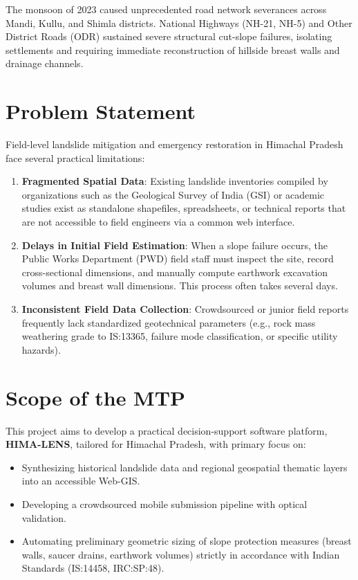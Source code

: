 \documentclass[12pt,a4paper]{report}
\begin{document}
The monsoon of 2023 caused unprecedented road network severances across Mandi, Kullu, and Shimla districts. National Highways (NH-21, NH-5) and Other District Roads (ODR) sustained severe structural cut-slope failures, isolating settlements and requiring immediate reconstruction of hillside breast walls and drainage channels.

\section{Problem Statement}
Field-level landslide mitigation and emergency restoration in Himachal Pradesh face several practical limitations:
\begin{enumerate}
    \item \textbf{Fragmented Spatial Data}: Existing landslide inventories compiled by organizations such as the Geological Survey of India (GSI) or academic studies exist as standalone shapefiles, spreadsheets, or technical reports that are not accessible to field engineers via a common web interface.
    \item \textbf{Delays in Initial Field Estimation}: When a slope failure occurs, the Public Works Department (PWD) field staff must inspect the site, record cross-sectional dimensions, and manually compute earthwork excavation volumes and breast wall dimensions. This process often takes several days.
    \item \textbf{Inconsistent Field Data Collection}: Crowdsourced or junior field reports frequently lack standardized geotechnical parameters (e.g., rock mass weathering grade to IS:13365, failure mode classification, or specific utility hazards).
\end{enumerate}

\section{Scope of the MTP}
This project aims to develop a practical decision-support software platform, \textbf{HIMA-LENS}, tailored for Himachal Pradesh, with primary focus on:
\begin{itemize}
    \item Synthesizing historical landslide data and regional geospatial thematic layers into an accessible Web-GIS.
    \item Developing a crowdsourced mobile submission pipeline with optical validation.
    \item Automating preliminary geometric sizing of slope protection measures (breast walls, saucer drains, earthwork volumes) strictly in accordance with Indian Standards (IS:14458, IRC:SP:48).
\end{itemize}
\end{document}
